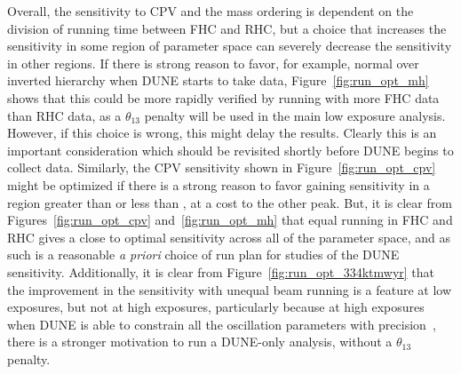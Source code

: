 Overall, the sensitivity to CPV and the mass ordering is dependent on the division of running time between FHC and RHC, but a choice that increases the sensitivity in some region of parameter space can severely decrease the sensitivity in other regions. If there is strong reason to favor, for example, normal over inverted hierarchy when DUNE starts to take data, Figure~\ref{fig:run_opt_mh} shows that this could be more rapidly verified by running with more FHC data than RHC data, as a $\theta_{13}$ penalty will be used in the main low exposure analysis. However, if this choice is wrong, this might delay the results. Clearly this is an important consideration which should be revisited shortly before DUNE begins to collect data. Similarly, the CPV sensitivity shown in Figure~\ref{fig:run_opt_cpv} might be optimized if there is a strong reason to favor gaining sensitivity in a region greater than or less than \deltacp, at a cost to the other peak. But, it is clear from Figures~\ref{fig:run_opt_cpv} and~\ref{fig:run_opt_mh} that equal running in FHC and RHC gives a close to optimal sensitivity across all of the parameter space, and as such is a reasonable {\it a priori} choice of run plan for studies of the DUNE sensitivity. Additionally, it is clear from Figure~\ref{fig:run_opt_334ktmwyr} that the improvement in the sensitivity with unequal beam running is a feature at low exposures, but not at high exposures, particularly because at high exposures when DUNE is able to constrain all the oscillation parameters with precision~\cite{Abi:2020qib}, there is a stronger motivation to run a DUNE-only analysis, without a $\theta_{13}$ penalty.


